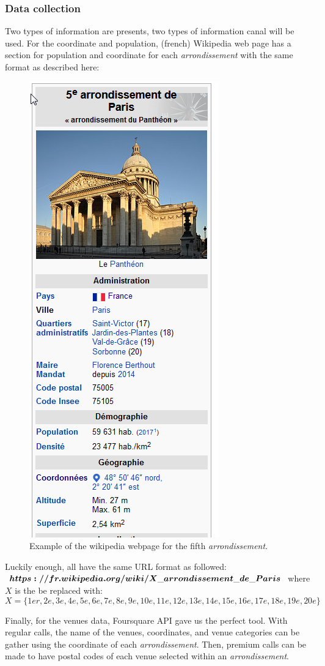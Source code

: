 \documentclass[english]{article}
\begin{document}
	\subsubsection{Data collection}
	Two types of information are presents, two types of information canal will be used. For the coordinate and population, (french) Wikipedia web page has a section for population and coordinate for each \textit{arrondissement} with the same format as described here:
	\begin{figure}[h]
		\centering
		\includegraphics[width=0.25\linewidth,keepaspectratio]{Figures/Exemple_Arrondissement_Wikipedia}
		\caption{Example of the wikipedia webpage for the fifth \textit{arrondissement}.}
		\label{Arrondissement}
	\end{figure}
	Luckily enough, all have the same URL format as followed: $https://fr.wikipedia.org/wiki/\boldmath{X}\_arrondissement\_de\_Paris$ where $X$ is the be replaced with:
	\begin{equation}
		X = \{1er, 2e, 3e, 4e, 5e, 6e, 7e, 8e, 9e, 10e, 11e, 12e, 13e, 14e, 15e, 16e, 17e, 18e, 19e, 20e\}
	\end{equation}
	
	Finally, for the venues data, Foursquare API gave us the perfect tool. With regular calls, the name of the venues, coordinates, and venue categories can be gather using the coordinate of each \textit{arrondissement}. Then, premium calls can be made to have postal codes of each venue selected within an \textit{arrondissement}.
\end{document}
